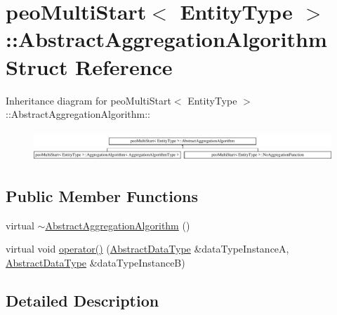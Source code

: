 \hypertarget{structpeoMultiStart_1_1AbstractAggregationAlgorithm}{
\section{peo\-Multi\-Start$<$ Entity\-Type $>$::Abstract\-Aggregation\-Algorithm Struct Reference}
\label{structpeoMultiStart_1_1AbstractAggregationAlgorithm}
}
Inheritance diagram for peo\-Multi\-Start$<$ Entity\-Type $>$::Abstract\-Aggregation\-Algorithm::\begin{figure}[H]
\begin{center}
\leavevmode
\includegraphics[height=1.1691cm]{structpeoMultiStart_1_1AbstractAggregationAlgorithm}
\end{center}
\end{figure}
\subsection*{Public Member Functions}
\begin{CompactItemize}
\item 
\hypertarget{structpeoMultiStart_1_1AbstractAggregationAlgorithm_58cbddc4a83735f15ff617a0a3121439}{
virtual \hyperlink{structpeoMultiStart_1_1AbstractAggregationAlgorithm_58cbddc4a83735f15ff617a0a3121439}{$\sim$Abstract\-Aggregation\-Algorithm} ()}
\label{structpeoMultiStart_1_1AbstractAggregationAlgorithm_58cbddc4a83735f15ff617a0a3121439}

\item 
\hypertarget{structpeoMultiStart_1_1AbstractAggregationAlgorithm_3122e126ba11de97e98563400482ae68}{
virtual void \hyperlink{structpeoMultiStart_1_1AbstractAggregationAlgorithm_3122e126ba11de97e98563400482ae68}{operator()} (\hyperlink{structpeoMultiStart_1_1AbstractDataType}{Abstract\-Data\-Type} \&data\-Type\-Instance\-A, \hyperlink{structpeoMultiStart_1_1AbstractDataType}{Abstract\-Data\-Type} \&data\-Type\-Instance\-B)}
\label{structpeoMultiStart_1_1AbstractAggregationAlgorithm_3122e126ba11de97e98563400482ae68}

\end{CompactItemize}


\subsection{Detailed Description}
